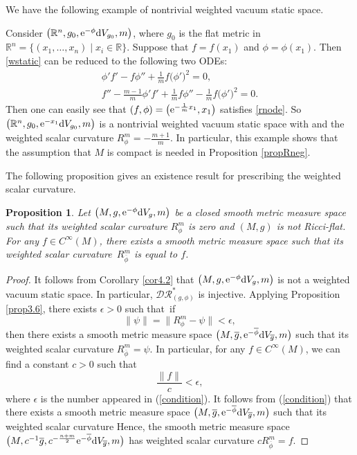 \documentclass[pdftex]{sigma}
\numberwithin{equation}{section}
\newtheorem{Proposition}[Theorem]{Proposition}
 { \theoremstyle{definition}
\newtheorem{Definition}[Theorem]{Definition}
\newtheorem{Note}[Theorem]{Note}
\newtheorem{Example}[Theorem]{Example}
\newtheorem{Remark}[Theorem]{Remark} }
\begin{document}
We have the following example of
 nontrivial weighted vacuum static space.

\begin{Example}
 Consider $\bigl(\mathbb{R}^n,g_0,{\rm e}^{-\phi}{\rm d}V_{g_0},m\bigr)$, where $g_0$ is the flat metric in $\mathbb{R}^n=\{(x_1,\dots,x_n)\mid \allowbreak x_i\in\mathbb{R}\}$. Suppose that $f=f(x_1)$ and $\phi=\phi(x_1)$. Then \eqref{wstatic} can be reduced to the following two ODEs:
 \begin{gather}\label{rnode}
 \phi'f'-f\phi''+\frac{1}{m}f\bigl(\phi'\bigr)^2=0,\\
f''-\frac{m-1}{m}\phi'f'+\frac{1}{m}f\phi''-\frac{1}{m}f\bigl(\phi'\bigr)^2=0.
 \end{gather}
Then one can easily see that $(f,\phi)=\bigl({\rm e}^{-\frac{1}{m}x_1},x_1\bigr)$ satisfies \eqref{rnode}. So $\bigl(\mathbb{R}^n,g_0,{\rm e}^{-x_1}{\rm d}V_{g_0},m\bigr)$ is a nontrivial weighted vacuum static space with  and the weighted scalar curvature $R_\phi^m=-\frac{m+1}{m}$.
In particular, this example shows that the assumption that $M$ is compact is needed in Proposition \ref{propRneg}.
\end{Example}

The following proposition gives an existence result
for prescribing the weighted scalar curvature.

\begin{Proposition}\label{prop4.2}
Let $\bigl(M,g,{\rm e}^{-\phi}{\rm d}V_g,m\bigr)$ be a closed smooth metric measure space
such that its weighted scalar curvature $R_\phi^m$ is zero
and $(M,g)$ is not Ricci-flat.
For any $f\in C^\infty(M)$,
there exists a
smooth metric measure space  such that
its weighted scalar curvature~$R_{\overline{\phi}}^m$ is equal to $f$.
\end{Proposition}
\begin{proof}
It follows from Corollary \ref{cor4.2} that
$\bigl(M,g,{\rm e}^{-\phi}{\rm d}V_g,m\bigr)$ is not a weighted vacuum static space.
In particular, $\mathcal{DR}_{(g,\phi)}^*$ is injective. Applying Proposition \ref{prop3.6}, there exists $\epsilon>0$ such that~if%
\begin{equation}\label{condition}
\|\psi\|=\|R_\phi^m-\psi\|<\epsilon,
\end{equation}
then there exists a smooth metric measure space $\bigl(M,\overline{g},{\rm e}^{-\overline{\phi}}{\rm d}V_{\overline{g}},m\bigr)$
such that its weighted scalar curvature $R_{\overline{\phi}}^m=\psi$.
In particular, for any $f\in C^\infty(M)$, we can find a constant $c>0$ such that
\[\frac{\|f\|}{c}<\epsilon,\]
where $\epsilon$ is the number appeared in (\ref{condition}).
It follows from (\ref{condition}) that
there exists a smooth metric measure space $\bigl(M,\overline{g},{\rm e}^{-\overline{\phi}}{\rm d}V_{\overline{g}},m\bigr)$
such that its weighted scalar curvature 
Hence, the smooth metric measure space $\bigl(M,c^{-1}\overline{g},c^{-\frac{n+m}{2}}{\rm e}^{-\overline{\phi}}{\rm d}V_{\overline{g}},m\bigr)$
has weighted scalar curvature $cR_{\overline{\phi}}^m=f$.
\end{proof}
\end{document}
